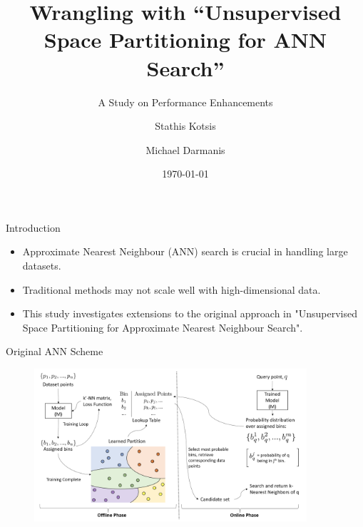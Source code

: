 \documentclass[10pt, aspectratio=169]{beamer}
\title{Wrangling with ``Unsupervised Space Partitioning for ANN Search''}
\subtitle{A Study on Performance Enhancements}
\date{\today}
\author{Stathis Kotsis \and Michael Darmanis}
\institute{M149 Database Systems, NKUA}
\begin{document}
\maketitle


\begin{frame}{Introduction}
    \begin{itemize}
        \item Approximate Nearest Neighbour (ANN) search is crucial in handling large datasets.
        \item Traditional methods may not scale well with high-dimensional data.
        \item This study investigates extensions to the original approach in "Unsupervised Space Partitioning for Approximate Nearest Neighbour Search".
    \end{itemize}
\end{frame}

\begin{frame}{Original ANN Scheme}
	\begin{figure}
		\includegraphics[width=0.90\textwidth]{plots/overview.png}
	\end{figure}
\end{frame}
\end{document}
